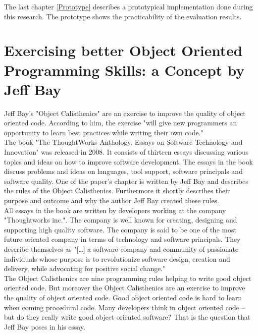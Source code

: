The last chapter \ref{Prototype} describes a prototypical implementation done during this research. The prototype shows the practicability of the evaluation results.

\section{Exercising better Object Oriented Programming Skills: a Concept by Jeff Bay}
\label{i:exercising}
Jeff Bay's "Object Calisthenics" \cite{bay2008} are an exercise to improve the quality of object oriented code. According to him, the exercise "will give new programmers an opportunity to learn best practices while writing their own code." \cite[p. 70]{bay2008}\\

The book "The ThoughtWorks Anthology. Essays on Software Technology and Innovation" \cite[p. 70-79]{oc2008} was released in 2008. It consists of thirteen essays discussing various topics and ideas on how to improve software development. The essays in the book discuss problems and ideas on languages, tool support, software principals and software quality. One of the paper's chapter is written by Jeff Bay and describes the rules of the Object Calisthenics. Furthermore it shortly describes their purpose and outcome and why the author Jeff Bay created these rules.\\

All essays in the book \cite{oc2008} are written by developers working at the company "Thoughtworks inc.". The company is well known for creating, designing and supporting high quality software. The company is said to be one of the most future oriented company in terms of technology and software principals. They describe themselves as "[\dots] a software company and community of passionate individuals whose purpose is to revolutionize software design, creation and delivery, while advocating for positive social change." \cite{twWeb}\\

The Object Calisthenics are nine programming rules helping to write good object oriented code. But moreover the Object Calisthenics are an exercise to improve the quality of object oriented code. Good object oriented code is hard to learn when coming procedural code. Many developers think in object oriented code -- but do they really write good object oriented software? That is the question that Jeff Bay poses in his essay.\\

